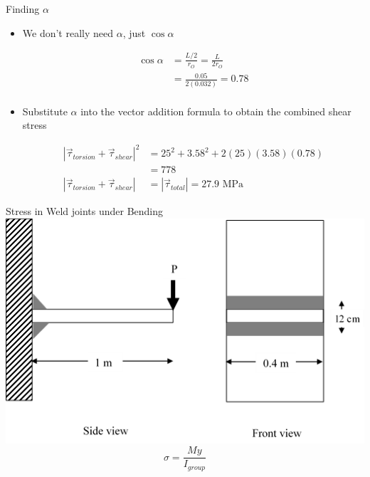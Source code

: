 \documentclass[10pt, svgnames]{beamer}
\begin{document}
\begin{frame}[label={sec:orgab1c75a}]{Finding \(\alpha\)}
\begin{itemize}
  \item We don't really need $\alpha$, just $\cos \alpha$

\begin{align*}
  \cos \alpha &= \frac{L/2}{r_{O}} = \frac{L}{2r_{O}} \\
              &= \frac{0.05}{2(0.032)} = 0.78 \\
\end{align*}

  \item Substitute $\alpha$ into the vector addition formula to obtain the combined shear stress

\begin{align*}
  \left| \vec{\tau}_{torsion} + \vec{\tau}_{shear} \right|^2 &= 25^2 + 3.58^2 + 2(25)(3.58)(0.78) \\
                                                             &= 778 \\
  \left| \vec{\tau}_{torsion} + \vec{\tau}_{shear} \right| &= \left| \vec{\tau}_{total} \right| = 27.9 \text{ MPa}                                                        
\end{align*}
\end{itemize}
\end{frame}

\begin{frame}[label={sec:org26fc603}]{Stress in Weld joints under Bending}
 \centering
\includegraphics[scale=0.6]{pictures/dual-fillet-cantilever}
$$ \sigma = \frac{My}{I_{group}} $$
\end{frame}
\end{document}
